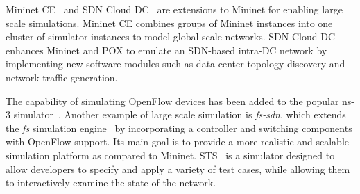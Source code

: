 Mininet CE~\cite{antonenko2013} and SDN Cloud DC~\cite{teixeira2013} are extensions 
to Mininet for enabling large scale simulations. Mininet CE combines groups of Mininet instances into one cluster 
of simulator instances to model global scale networks. SDN Cloud DC enhances Mininet and POX to emulate an SDN-based 
intra-DC network by implementing new software modules such as data center topology discovery and network traffic generation. 

The capability of simulating OpenFlow devices has been added to the popular ns-3 simulator~\cite{ns3project2013}.  
Another example of large scale simulation is \textit{fs-sdn}, which extends the \textit{fs} simulation engine~\cite{sommers2011} by incorporating a controller and switching components with OpenFlow support.
Its main goal is to provide a more realistic and scalable simulation platform as compared to Mininet.
STS~\cite{ucbsts2013} is a simulator designed to allow developers to specify and apply a variety of test cases, while allowing them to interactively examine the state of the network.



